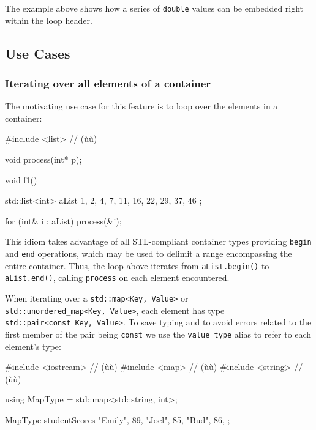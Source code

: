 {{\noindent The example above shows how a series of \lstinline!double! values can be
embedded right within the loop header.

\subsection[Use Cases]{Use Cases}\label{use-cases}

\subsubsection[Iterating over all elements of a container]{Iterating over all elements of a container}\label{iterating-over-all-elements-of-a-container}

The motivating use case for this feature is to loop over the elements in
a container:

\begin{emcppslisting}
#include <list>  // (ù{}ù)

void process(int* p);

void f1()
{
    std::list<int> aList{ 1, 2, 4, 7, 11, 16, 22, 29, 37, 46 };

    for (int& i : aList)
    {
        process(&i);
    }
}
\end{emcppslisting}


\noindent This idiom takes advantage of all STL-compliant container types
providing \lstinline!begin! and \lstinline!end! operations, which may be used
to delimit a range encompassing the entire container. Thus, the loop
above iterates from \lstinline!aList.begin()! to \lstinline!aList.end()!,
calling \lstinline!process! on each element encountered.

When iterating over a \lstinline!std::map<Key,!~\lstinline!Value>! or
\lstinline!std::unordered_map<Key,!~\lstinline!Value>!, each element has type
\lstinline!std::pair<const!~\lstinline!Key,!~\lstinline!Value>!. To save typing
and to avoid errors related to the first member of the pair being
\lstinline!const! we use the \lstinline!value_type! alias to refer to each
element's type:

\begin{emcppslisting}
#include <iostream>  // (ù{}ù)
#include <map>       // (ù{}ù)
#include <string>    // (ù{}ù)

using MapType = std::map<std::string, int>;

MapType studentScores
{
    {"Emily", 89},
    {"Joel",  85},
    {"Bud",   86},
};


\end{emcppslisting}}}
